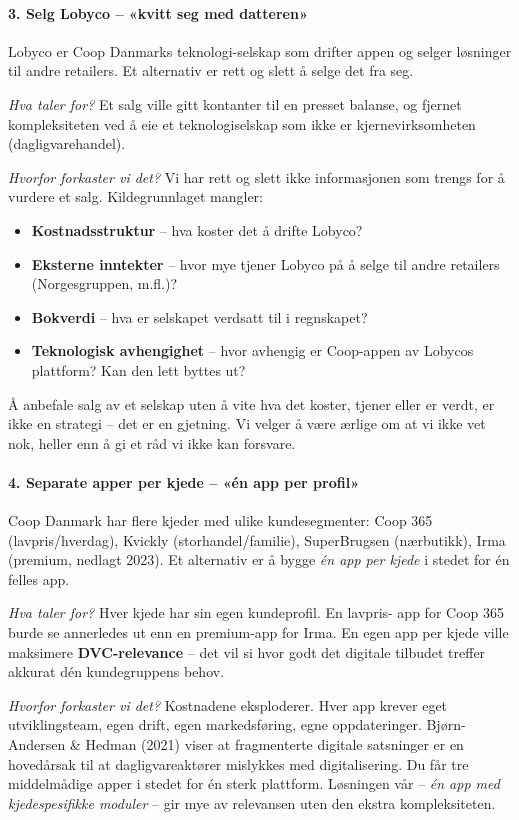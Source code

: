 \paragraph{3. Selg Lobyco -- «kvitt seg med datteren»}
Lobyco er Coop Danmarks teknologi-selskap som drifter appen og selger
løsninger til andre retailers. Et alternativ er rett og slett å selge
det fra seg.

\emph{Hva taler for?} Et salg ville gitt kontanter til en presset
balanse, og fjernet kompleksiteten ved å eie et teknologiselskap som
ikke er kjernevirksomheten (dagligvarehandel).

\emph{Hvorfor forkaster vi det?} Vi har rett og slett ikke
informasjonen som trengs for å vurdere et salg. Kildegrunnlaget mangler:
\begin{itemize}
  \item \textbf{Kostnadsstruktur} -- hva koster det å drifte Lobyco?
  \item \textbf{Eksterne inntekter} -- hvor mye tjener Lobyco på å
    selge til andre retailers (Norgesgruppen, m.fl.)?
  \item \textbf{Bokverdi} -- hva er selskapet verdsatt til i regnskapet?
  \item \textbf{Teknologisk avhengighet} -- hvor avhengig er Coop-appen
    av Lobycos plattform? Kan den lett byttes ut?
\end{itemize}
Å anbefale salg av et selskap uten å vite hva det koster, tjener eller
er verdt, er ikke en strategi -- det er en gjetning. Vi velger å være
ærlige om at vi ikke vet nok, heller enn å gi et råd vi ikke kan
forsvare.

\paragraph{4. Separate apper per kjede -- «én app per profil»}
Coop Danmark har flere kjeder med ulike kundesegmenter: Coop 365
(lavpris/hverdag), Kvickly (storhandel/familie), SuperBrugsen
(nærbutikk), Irma (premium, nedlagt 2023). Et alternativ er å bygge
\emph{én app per kjede} i stedet for én felles app.

\emph{Hva taler for?} Hver kjede har sin egen kundeprofil. En lavpris-
app for Coop 365 burde se annerledes ut enn en premium-app for Irma. En
egen app per kjede ville maksimere \textbf{DVC-relevance} -- det vil si
hvor godt det digitale tilbudet treffer akkurat dén kundegruppens
behov.

\emph{Hvorfor forkaster vi det?} Kostnadene eksploderer. Hver app
krever eget utviklingsteam, egen drift, egen markedsføring, egne
oppdateringer. Bjørn-Andersen \& Hedman (2021) viser at fragmenterte
digitale satsninger er en hovedårsak til at dagligvareaktører
mislykkes med digitalisering. Du får tre middelmådige apper i stedet
for én sterk plattform. Løsningen vår -- \emph{én app med
kjedespesifikke moduler} -- gir mye av relevansen uten den ekstra
kompleksiteten.

